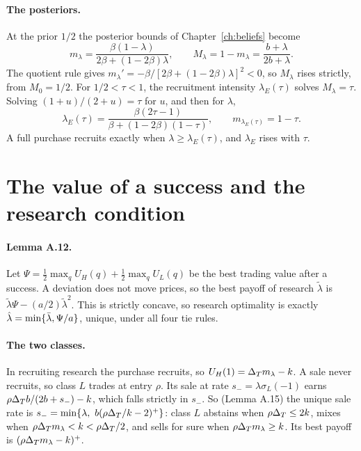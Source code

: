 \paragraph{The posteriors.} At the prior \(1/2\) the posterior bounds of Chapter~\ref{ch:beliefs} become
\begin{equation}\label{eq:research-bounds}
m_\lambda=\frac{\beta(1-\lambda)}{2\beta+(1-2\beta)\lambda},\qquad
M_\lambda=1-m_\lambda=\frac{b+\lambda}{2b+\lambda}.
\end{equation}
The quotient rule gives \(m_\lambda'=-\beta/[2\beta+(1-2\beta)\lambda]^2<0\), so \(M_\lambda\) rises strictly, from
\(M_0=1/2\). For \(1/2<\tau<1\), the recruitment intensity \(\lambda_E(\tau)\) solves \(M_\lambda=\tau\). Solving \((1+u)/(2+u)=\tau\) for \(u\), and then for \(\lambda\),
\begin{equation}\label{eq:research-lamE}
\lambda_E(\tau)=\frac{\beta(2\tau-1)}{\beta+(1-2\beta)(1-\tau)},\qquad m_{\lambda_E(\tau)}=1-\tau .
\end{equation}
A full purchase recruits exactly when \(\lambda\ge\lambda_E(\tau)\), and \(\lambda_E\) rises with \(\tau\).

\section{The value of a success and the research condition}\label{sec:research-value}

\paragraph{Lemma A.12.} Let \(\Psi=\tfrac12\max_qU_H(q)+\tfrac12\max_qU_L(q)\) be the best trading value after a
success. A deviation does not move prices, so the best payoff of research \(\tilde\lambda\) is
\(\tilde\lambda\Psi-(a/2)\tilde\lambda^2\). This is strictly concave, so research optimality is exactly
\(\hat\lambda=\min\{\bar\lambda,\Psi/a\}\), unique, under all four tie rules.

\paragraph{The two classes.} In recruiting research the purchase recruits, so \(U_H(1)=\Delta_T m_\lambda-k\). A sale never
recruits, so class \(L\) trades at entry \(\rho\). Its sale at rate \(s_-=\lambda\sigma_L(-1)\) earns
\(\rho\Delta_T b/(2b+s_-)-k\), which falls strictly in \(s_-\). So (Lemma A.15) the unique sale rate is
\(s_-=\min\{\lambda,\ b(\rho\Delta_T/k-2)^+\}\): class \(L\) abstains when \(\rho\Delta_T\le2k\), mixes when
\(\rho\Delta_T m_\lambda<k<\rho\Delta_T/2\), and sells for sure when \(\rho\Delta_T m_\lambda\ge k\). Its best payoff is
\((\rho\Delta_T m_\lambda-k)^+\).

